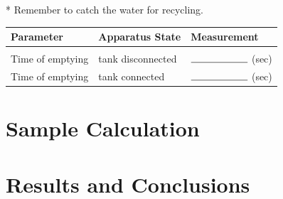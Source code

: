 \documentclass{article}
\begin{document}
* Remember to catch the water for recycling.


\begin{tabular}{lll}
  Parameter & Apparatus State & Measurement \\
  \hline \\
  Time of emptying & tank disconnected & $\rule{2cm}{0.15mm}$ (sec)\\
  Time of emptying & tank connected & $\rule{2cm}{0.15mm}$ (sec)\\

\end{tabular}




\section{Sample Calculation}




\section{Results and Conclusions}
%
%
\end{document}
